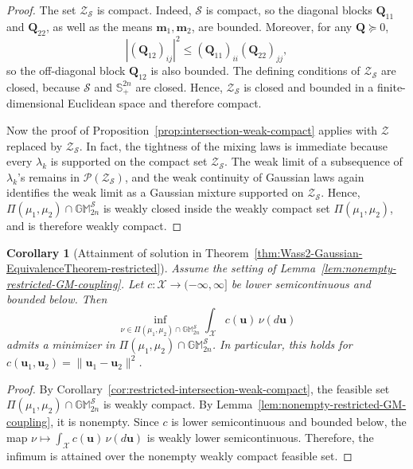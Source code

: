 \documentclass[opre,sglanonrev]{informs4}
\newtheorem{corollary}{Corollary}
\newcommand{\mX}{\mathcal{X}}
\newcommand{\mbS}{\mathbb S}
\newcommand{\mbGM}{\mathbb{GM}}
\newcommand{\bmean}{\bm{m}}
\newcommand{\bu}{\bm{u}}
\newcommand{\bQ}{\bm Q}
\begin{document}
{\begin{APPENDICES}
\begin{proof}
The set \(\mathcal Z_{\mathcal S}\) is compact. Indeed, \(\mathcal S\) is compact,
so the diagonal blocks \(\bQ_{11}\) and \(\bQ_{22}\), as well as the
means \(\bmean_1,\bmean_2\), are bounded. Moreover, for any
\(\bQ\succeq0\),
\[
|(\bQ_{12})_{ij}|^2
\le
(\bQ_{11})_{ii}(\bQ_{22})_{jj},
\]
so the off-diagonal block \(\bQ_{12}\) is also bounded. The defining
conditions of \(\mathcal Z_{\mathcal S}\) are closed, because
\(\mathcal S\) and \(\mbS^{2n}_+\) are closed. Hence,
\(\mathcal Z_{\mathcal S}\) is closed and bounded in a finite-dimensional Euclidean space and therefore compact.

Now the proof of Proposition~\ref{prop:intersection-weak-compact} applies with
\(\mathcal Z\) replaced by \(\mathcal Z_{\mathcal S}\). In fact, the tightness
of the mixing laws is immediate because every \(\lambda_k\) is supported on the
compact set \(\mathcal Z_{\mathcal S}\). The weak limit of a subsequence of
\(\lambda_k\)'s remains in \(\mathcal P(\mathcal Z_{\mathcal S})\), and the
weak continuity of Gaussian laws again identifies the weak limit as a Gaussian
mixture supported on \(\mathcal Z_{\mathcal S}\). Hence,
\(\Pi(\mu_1,\mu_2)\cap\mbGM_{2n}^{\mathcal S}\) is weakly closed inside the
weakly compact set \(\Pi(\mu_1,\mu_2)\), and is therefore weakly compact.
\end{proof}

\begin{corollary}[Attainment of solution in Theorem~\ref{thm:Wass2-Gaussian-EquivalenceTheorem-restricted}]
\label{cor:attainment-restricted-intersection}
Assume the setting of Lemma~\ref{lem:nonempty-restricted-GM-coupling}. Let
\(c:\mX\to(-\infty,\infty]\) be lower semicontinuous and bounded below. Then
\[
\inf_{\nu\in \Pi(\mu_1,\mu_2)\cap \mbGM_{2n}^{\mathcal S}}
\int_{\mX} c(\bu)\,\nu(d\bu)
\]
admits a minimizer in
\(\Pi(\mu_1,\mu_2)\cap \mbGM_{2n}^{\mathcal S}\). In particular, this holds for
\(c(\bu_1,\bu_2)=\|\bu_1-\bu_2\|^2\).
\end{corollary}

\begin{proof}
By Corollary~\ref{cor:restricted-intersection-weak-compact}, the feasible set $\Pi(\mu_1,\mu_2)\cap \mbGM_{2n}^{\mathcal S}$ is weakly compact. By Lemma~\ref{lem:nonempty-restricted-GM-coupling}, it is nonempty. Since \(c\) is lower semicontinuous and bounded below, the map $\nu\mapsto \int_{\mX}c(\bu)\,\nu(d\bu)$ is weakly lower semicontinuous. Therefore, the infimum is attained over the nonempty weakly compact feasible set.
\end{proof}


\end{APPENDICES}}
\end{document}
